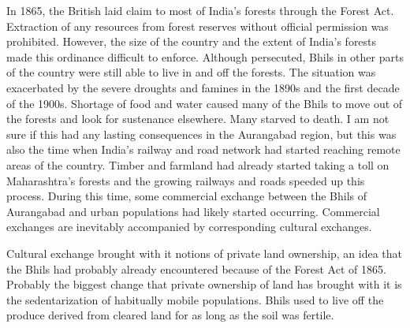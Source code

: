 \documentclass[report.tex]{subfiles}
\begin{document}
In 1865, the British laid claim to most of India's forests through the Forest Act. Extraction of any resources from forest reserves without official permission was prohibited. However, the size of the country and the extent of India's forests made this ordinance difficult to enforce. Although persecuted, Bhils in other parts of the country were still able to live in and off the forests. The situation was exacerbated by the severe droughts and famines in the 1890s and the first decade of the 1900s. Shortage of food and water caused many of the Bhils to move out of the forests and look for sustenance elsewhere. Many starved to death. I am not sure if this had any lasting consequences in the Aurangabad region, but this was also the time when India's railway and road network had started reaching remote areas of the country. Timber and farmland had already started taking a toll on Maharashtra's forests and the growing railways and roads speeded up this process. During this time, some commercial exchange between the Bhils of Aurangabad and urban populations had likely started occurring. Commercial exchanges are inevitably accompanied by corresponding cultural exchanges.

Cultural exchange brought with it notions of private land ownership, an idea that the Bhils had probably already encountered because of the Forest Act of 1865. Probably the biggest change that private ownership of land has brought with it is the sedentarization of habitually mobile populations. Bhils used to live off the produce derived from cleared land for as long as the soil was fertile.
\end{document}

